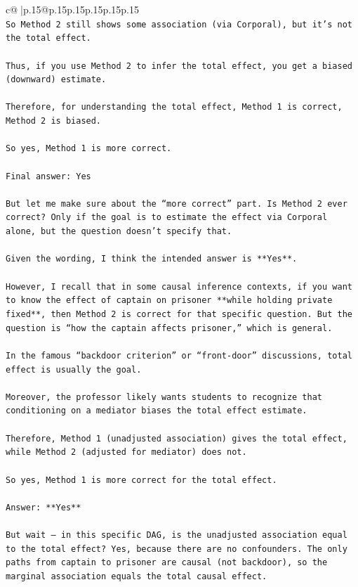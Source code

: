 \documentclass{article}
\begin{document}
{\begin{supertabular}{c@{$\;$}|p{.15\linewidth}@{}p{.15\linewidth}p{.15\linewidth}p{.15\linewidth}p{.15\linewidth}p{.15\linewidth}}
{{{\\ 
\texttt{So Method 2 still shows some association (via Corporal), but it’s not the total effect.} \\
\\ 
\texttt{Thus, if you use Method 2 to infer the total effect, you get a biased (downward) estimate.} \\
\\ 
\texttt{Therefore, for understanding the total effect, Method 1 is correct, Method 2 is biased.} \\
\\ 
\texttt{So yes, Method 1 is more correct.} \\
\\ 
\texttt{Final answer: Yes} \\
\\ 
\texttt{But let me make sure about the “more correct” part. Is Method 2 ever correct? Only if the goal is to estimate the effect via Corporal alone, but the question doesn’t specify that.} \\
\\ 
\texttt{Given the wording, I think the intended answer is **Yes**.} \\
\\ 
\texttt{However, I recall that in some causal inference contexts, if you want to know the effect of captain on prisoner **while holding private fixed**, then Method 2 is correct for that specific question. But the question is “how the captain affects prisoner,” which is general.} \\
\\ 
\texttt{In the famous “backdoor criterion” or “front{-}door” discussions, total effect is usually the goal.} \\
\\ 
\texttt{Moreover, the professor likely wants students to recognize that conditioning on a mediator biases the total effect estimate.} \\
\\ 
\texttt{Therefore, Method 1 (unadjusted association) gives the total effect, while Method 2 (adjusted for mediator) does not.} \\
\\ 
\texttt{So yes, Method 1 is more correct for the total effect.} \\
\\ 
\texttt{Answer: **Yes**} \\
\\ 
\texttt{But wait — in this specific DAG, is the unadjusted association equal to the total effect? Yes, because there are no confounders. The only paths from captain to prisoner are causal (not backdoor), so the marginal association equals the total causal effect.} \\
}}}
\end{supertabular}}
\end{document}

